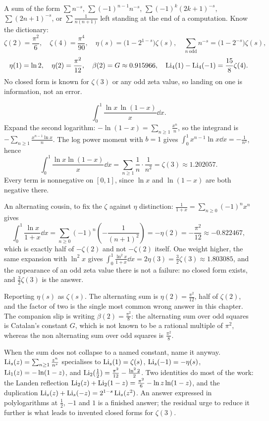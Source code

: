 \cue A sum of the form $\sum n^{-s}$, $\sum(-1)^{n-1}n^{-s}$, $\sum(-1)^{k}(2k+1)^{-s}$, $\sum(2n+1)^{-s}$, or $\sum\frac{1}{n(n+1)}$ left standing at the end of a computation.
\method Know the dictionary:
\[\zeta(2)=\frac{\pi^{2}}{6},\quad \zeta(4)=\frac{\pi^{4}}{90},\quad \eta(s)=\bigl(1-2^{1-s}\bigr)\zeta(s),\quad \sum_{n\ \mathrm{odd}}n^{-s}=\bigl(1-2^{-s}\bigr)\zeta(s),\]
\[\eta(1)=\ln2,\quad \eta(2)=\frac{\pi^{2}}{12},\quad \beta(2)=G\approx0.915966,\quad \operatorname{Li}_4(1)-\operatorname{Li}_4(-1)=\frac{15}{8}\zeta(4).\]
No closed form is known for $\zeta(3)$ or any odd zeta value, so landing on one is information, not an error.

\begin{worked}
\[\int_0^1\frac{\ln x\,\ln(1-x)}{x}\dd x.\]
Expand the second logarithm: $-\ln(1-x)=\sum_{n\geq1}\frac{x^{n}}{n}$, so the integrand is $-\sum_{n\geq1}\frac{x^{n-1}\ln x}{n}$. The log power moment with $b=1$ gives $\int_0^1x^{n-1}\ln x\dd x=-\frac{1}{n^{2}}$, hence
\[\int_0^1\frac{\ln x\ln(1-x)}{x}\dd x=\sum_{n\geq1}\frac{1}{n}\cdot\frac{1}{n^{2}}=\zeta(3)\approx1.202057.\]
Every term is nonnegative on $[0,1]$, since $\ln x$ and $\ln(1-x)$ are both negative there.

An alternating cousin, to fix the $\zeta$ against $\eta$ distinction: $\frac{1}{1+x}=\sum_{n\geq0}(-1)^{n}x^{n}$ gives
\[\int_0^1\frac{\ln x}{1+x}\dd x=\sum_{n\geq0}(-1)^{n}\left(-\frac{1}{(n+1)^{2}}\right)=-\eta(2)=-\frac{\pi^{2}}{12}\approx-0.822467,\]
which is exactly half of $-\zeta(2)$ and not $-\zeta(2)$ itself. One weight higher, the same expansion with $\ln^{2}x$ gives $\int_0^1\frac{\ln^{2}x}{1+x}\dd x=2\eta(3)=\tfrac32\zeta(3)\approx1.803085$, and the appearance of an odd zeta value there is not a failure: no closed form exists, and $\tfrac32\zeta(3)$ is the answer.
\end{worked}

\begin{trap}
Reporting $\eta(s)$ as $\zeta(s)$. The alternating sum is $\eta(2)=\tfrac{\pi^{2}}{12}$, half of $\zeta(2)$, and the factor of two is the single most common wrong answer in this chapter. The companion slip is writing $\beta(2)=\tfrac{\pi^{2}}{8}$: the alternating sum over odd squares is Catalan's constant $G$, which is not known to be a rational multiple of $\pi^{2}$, whereas the non alternating sum over odd squares is $\tfrac{\pi^{2}}{8}$.
\end{trap}

\begin{keynote}
When the sum does not collapse to a named constant, name it anyway. $\operatorname{Li}_s(z)=\sum_{n\geq1}\frac{z^{n}}{n^{s}}$ specialises to $\operatorname{Li}_s(1)=\zeta(s)$, $\operatorname{Li}_s(-1)=-\eta(s)$, $\operatorname{Li}_1(z)=-\ln(1-z)$, and $\operatorname{Li}_2(\tfrac12)=\tfrac{\pi^{2}}{12}-\tfrac{\ln^{2}2}{2}$. Two identities do most of the work: the Landen reflection $\operatorname{Li}_2(z)+\operatorname{Li}_2(1-z)=\tfrac{\pi^{2}}{6}-\ln z\ln(1-z)$, and the duplication $\operatorname{Li}_s(z)+\operatorname{Li}_s(-z)=2^{1-s}\operatorname{Li}_s(z^{2})$. An answer expressed in polylogarithms at $\tfrac12$, $-1$ and $1$ is a finished answer; the residual urge to reduce it further is what leads to invented closed forms for $\zeta(3)$.
\end{keynote}

